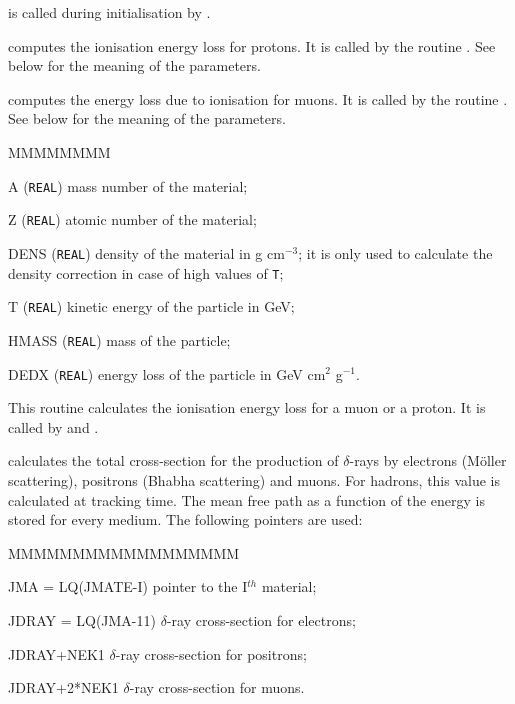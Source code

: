  is called during initialisation by .


 computes the ionisation energy loss for 
protons. It is called by the routine . See 
below for the meaning of the parameters.


 computes the energy loss due to ionisation for 
muons. It is called by the routine . See 
below for the meaning of the parameters.


\begin{DLtt}{MMMMMMMM}
\item[A] ({\tt REAL}) mass number of the material;
\item[Z] ({\tt REAL}) atomic number of the material;
\item[DENS] ({\tt REAL}) density of the material in g cm$^{-3}$; it is only used 
to calculate the density correction in case of high values of {\tt T};
\item[T] ({\tt REAL}) kinetic energy of the particle in GeV;
\item[HMASS] ({\tt REAL}) mass of the particle;
\item[DEDX] ({\tt REAL}) energy loss of the particle in GeV cm$^{2}$ g$^{-1}$.
\end{DLtt}

This routine calculates the ionisation energy loss for a muon or a
proton. It is called by  and .



 calculates the total cross-section for the production
of $\delta$-rays by electrons (M\"{o}ller scattering), positrons
(Bhabha scattering) and muons.
For hadrons, this value is calculated
at tracking time. The mean free path as a function of the energy
is stored for every medium. The following pointers are used: 

\begin{DLtt}{MMMMMMMMMMMMMMMMMM}
\item[JMA = LQ(JMATE-I)]  pointer to the I$^{th}$ material;
\item[JDRAY = LQ(JMA-11)]  $\delta$-ray cross-section for electrons;
\item[JDRAY+NEK1]  $\delta$-ray cross-section for positrons;
\item[JDRAY+2*NEK1]  $\delta$-ray cross-section for muons.
\end{DLtt}

